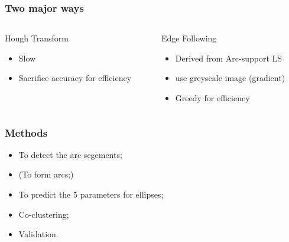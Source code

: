 \documentclass{beamer}
\begin{document}
    \begin{frame}
        \frametitle{Two major ways}
        
        

        \begin{columns}
            \begin{column}{.5\linewidth}
                Hough Transform
                \begin{itemize}
                    \item Slow
                    \item Sacrifice accuracy for efficiency
                \end{itemize}
            \end{column}
            \begin{column}{.5\linewidth}
                Edge Following
                \begin{itemize}
                    \item Derived from Arc-support LS 
                    \item use greyscale image (gradient)
                    \item Greedy for efficiency
                \end{itemize}
            \end{column}
        \end{columns}
        
    \end{frame}

    \begin{frame}
        \frametitle{Methods}
    
        \begin{itemize}
            \item To detect the arc segements;
            \item (To form arcs;)
            \item To predict the 5 parameters for ellipses;
            \item Co-clustering;
            \item Validation.
        \end{itemize}
    
    \end{frame}
\end{document}
